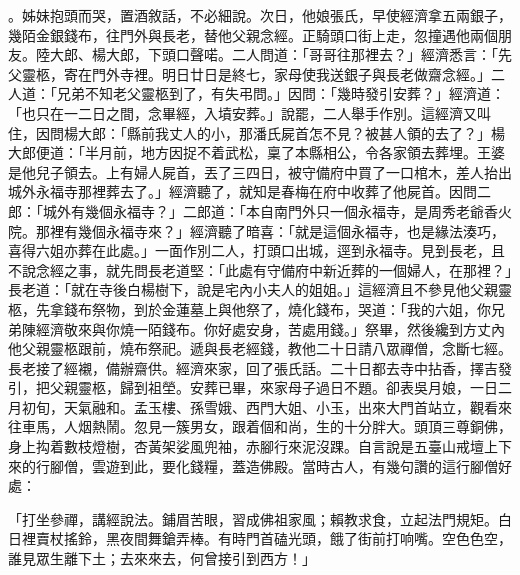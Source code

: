 。姊妹抱頭而哭，置酒敘話，不必細說。次日，他娘張氏，早使經濟拿五兩銀子，幾陌金銀錢布，往門外與長老，替他父親念經。正騎頭口街上走，忽撞遇他兩個朋友。陸大郎、楊大郎，下頭口聲喏。二人問道：「哥哥往那裡去？」經濟悉言：「先父靈柩，寄在門外寺裡。明日廿日是終七，家母使我送銀子與長老做齋念經。」二人道：「兄弟不知老父靈柩到了，有失弔問。」因問：「幾時發引安葬？」經濟道：「也只在一二日之間，念畢經，入墳安葬。」說罷，二人舉手作別。這經濟又叫住，因問楊大郎：「縣前我丈人的小，那潘氏屍首怎不見？被甚人領的去了？」楊大郎便道：「半月前，地方因捉不着武松，稟了本縣相公，令各家領去葬埋。王婆是他兒子領去。上有婦人屍首，丟了三四日，被守備府中買了一口棺木，差人抬出城外永福寺那裡葬去了。」經濟聽了，就知是春梅在府中收葬了他屍首。因問二郎：「城外有幾個永福寺？」二郎道：「本自南門外只一個永福寺，是周秀老爺香火院。那裡有幾個永福寺來？」經濟聽了暗喜：「就是這個永福寺，也是緣法湊巧，喜得六姐亦葬在此處。」一面作別二人，打頭口出城，逕到永福寺。見到長老，且不說念經之事，就先問長老道堅：「此處有守備府中新近葬的一個婦人，在那裡？」長老道：「就在寺後白楊樹下，說是宅內小夫人的姐姐。」這經濟且不參見他父親靈柩，先拿錢布祭物，到於金蓮墓上與他祭了，燒化錢布，哭道：「我的六姐，你兄弟陳經濟敬來與你燒一陌錢布。你好處安身，苦處用錢。」祭畢，然後纔到方丈內他父親靈柩跟前，燒布祭祀。遞與長老經錢，教他二十日請八眾禪僧，念斷七經。長老接了經襯，備辦齋供。經濟來家，回了張氏話。二十日都去寺中拈香，擇吉發引，把父親靈柩，歸到祖塋。安葬已畢，來家母子過日不題。卻表吳月娘，一日二月初旬，天氣融和。孟玉樓、孫雪娥、西門大姐、小玉，出來大門首站立，觀看來往車馬，人烟熱鬧。忽見一簇男女，跟着個和尚，生的十分胖大。頭頂三尊銅佛，身上抅着數枝燈樹，杏黃架娑風兜袖，赤腳行來泥沒踝。自言說是五臺山戒壇上下來的行腳僧，雲遊到此，要化錢糧，蓋造佛殿。當時古人，有幾句讚的這行腳僧好處：

「打坐參禪，講經說法。鋪眉苦眼，習成佛祖家風；賴教求食，立起法門規矩。白日裡賣杖搖鈴，黑夜間舞鎗弄棒。有時門首磕光頭，餓了街前打响嘴。空色色空，誰見眾生離下土；去來來去，何曾接引到西方！」

